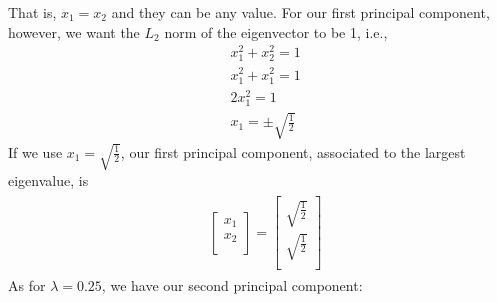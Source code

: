 \documentclass[leqno]{article}
\begin{document}
That is, $x_1 = x_2$ and they can be any value. For our first principal component, however, we want the $L_2$ norm of the eigenvector to be 1, i.e.,
\begin{equation*}
\begin{split}
&x_1^2 + x_2^2 = 1\\
&x_1^2 + x_1^2 = 1\\
&2x_1^2 = 1\\
&x_1 = \pm \sqrt{\frac{1}{2}}  
\end{split}
\end{equation*}
If we use $x_1 = \sqrt{\frac{1}{2}}$, our first principal component, associated to the largest eigenvalue, is
\begin{gather*}
\begin{split}
&\begin{bmatrix}
    x_1 \\
    x_2  \\
\end{bmatrix} =
\begin{bmatrix} 
   \sqrt{\frac{1}{2}}\\
   \sqrt{\frac{1}{2}}\\
\end{bmatrix}
\end{split}
\end{gather*}
As for $\lambda = 0.25$, we have our second principal component:
\end{document}
